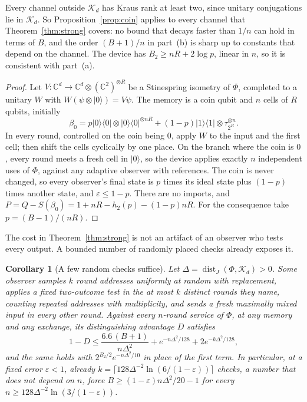 \documentclass[11pt]{article}
\newtheorem{corollary}[lemma]{Corollary}
\theoremstyle{definition}
\theoremstyle{remark}
\DeclareMathOperator{\dist}{dist}
\newcommand{\K}{\mathcal K}
\newcommand{\C}{\mathbb C}
\newcommand{\ket}[1]{\lvert#1\rangle}
\newcommand{\bra}[1]{\langle#1\rvert}
\newcommand{\eps}{\varepsilon}
\begin{document}
Every channel outside $\K_d$ has Kraus rank at least two, since unitary conjugations lie in $\K_d$. So Proposition~\ref{prop:coin} applies to every channel that Theorem~\ref{thm:strong} covers: no bound that decays faster than $1/n$ can hold in terms of $B$, and the order $(B+1)/n$ in part~(b) is sharp up to constants that depend on the channel. The device has $B_2\ge nR+2\log p$, linear in $n$, so it is consistent with part~(a).

\begin{proof}
Let $V:\C^d\to\C^d\otimes(\C^2)^{\otimes R}$ be a Stinespring isometry of $\Phi$, completed to a unitary $W$ with $W(\psi\otimes\ket0)=V\psi$. The memory is a coin qubit and $n$ cells of $R$ qubits, initially
\[
 \beta_0=p\ket0\bra0\otimes\ket0\bra0^{\otimes nR}+(1-p)\ket1\bra1\otimes\tau_{2^R}^{\otimes n}.
\]
In every round, controlled on the coin being $0$, apply $W$ to the input and the first cell; then shift the cells cyclically by one place. On the branch where the coin is $0$, every round meets a fresh cell in $\ket0$, so the device applies exactly $n$ independent uses of $\Phi$, against any adaptive observer with references. The coin is never changed, so every observer's final state is $p$ times its ideal state plus $(1-p)$ times another state, and $\eps\le1-p$. There are no imports, and $P=Q-S(\beta_0)=1+nR-h_2(p)-(1-p)nR$. For the consequence take $p=(B-1)/(nR)$.
\end{proof}

The cost in Theorem~\ref{thm:strong} is not an artifact of an observer who tests every output. A bounded number of randomly placed checks already exposes it.

\begin{corollary}[A few random checks suffice]\label{cor:spot}
Let $\Delta=\dist_J(\Phi,\K_d)>0$. Some observer samples $k$ round addresses uniformly at random with replacement, applies a fixed two-outcome test in the at most $k$ distinct rounds they name, counting repeated addresses with multiplicity, and sends a fresh maximally mixed input in every other round. Against every $n$-round service of $\Phi$, at any memory and any exchange, its distinguishing advantage $D$ satisfies
\[
 1-D\le\frac{6.6\,(B+1)}{n\Delta^2}+e^{-n\Delta^2/128}+2e^{-k\Delta^2/128},
\]
and the same holds with $2^{B_2/2}e^{-n\Delta^2/10}$ in place of the first term. In particular, at a fixed error $\eps<1$, already $k=\lceil128\Delta^{-2}\ln(6/(1-\eps))\rceil$ checks, a number that does not depend on $n$, force $B\ge(1-\eps)n\Delta^2/20-1$ for every $n\ge128\Delta^{-2}\ln(3/(1-\eps))$.
\end{corollary}
\end{document}
